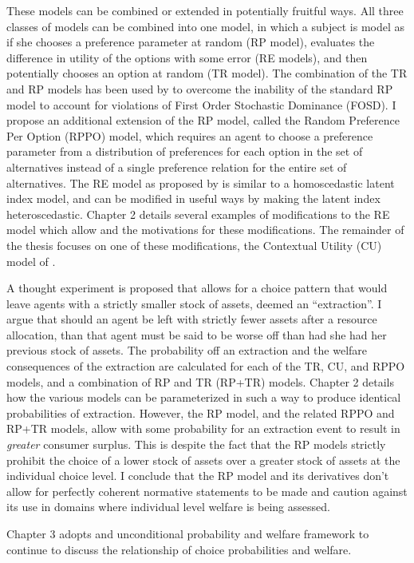 \documentclass[../main.tex]{subfiles}
\begin{document}
These models can be combined or extended in potentially fruitful ways.
All three classes of models can be combined into one model, in which a subject is model as if she chooses a preference parameter at random (RP model), evaluates the difference in utility of the options with some error (RE models), and then potentially chooses an option at random (TR model).
The combination of the TR and RP models has been used by \textcite{Loomes2002} to overcome the inability of the standard RP model to  account for violations of First Order Stochastic Dominance (FOSD).
I propose an additional extension of the RP model, called the Random Preference Per Option (RPPO) model, which requires an agent to choose a preference parameter from a distribution of preferences for each option in the set of alternatives instead of a single preference relation for the entire set of alternatives.
The RE model as proposed by \textcite{Hey1994} is similar to a homoscedastic latent index model, and can be modified in useful ways by making the latent index heteroscedastic.
Chapter 2 details several examples of modifications to the RE model which allow and the motivations for these modifications.
The remainder of the thesis focuses on one of these modifications, the Contextual Utility (CU) model of \textcite{Wilcox2008}.

A thought experiment is proposed that allows for a choice pattern that would leave agents with a strictly smaller stock of assets, deemed an \enquote{extraction}.
I argue that should an agent be left with strictly fewer assets after a resource allocation, than that agent must be said to be worse off than had she had her previous stock of assets.
The probability off an extraction and the welfare consequences of the extraction are calculated for each of the TR, CU, and RPPO models, and a combination of RP and TR (RP+TR) models.
Chapter 2 details how the various models can be parameterized in such a way to produce identical probabilities of extraction.
However, the RP model, and the related RPPO and RP+TR models, allow with some probability for an extraction event to result in \textit{greater} consumer surplus.
This is despite the fact that the RP models strictly prohibit the choice of a lower stock of assets over a greater stock of assets at the individual choice level.
I conclude that the RP model and its derivatives don't allow for perfectly coherent normative statements to be made and caution against its use in domains where individual level welfare is being assessed.

Chapter 3 adopts and unconditional probability and welfare framework to continue to discuss the relationship of choice probabilities and welfare.
\end{document}
